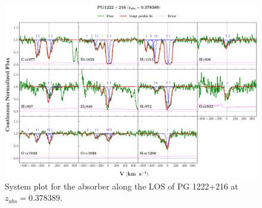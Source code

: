   
  \newpage
  \thispagestyle{empty}

  \begin{landscape}
  
  \begin{figure}
      \centering
      \vspace{-10mm}
      \hspace*{-20mm}
      \includegraphics[width=1.1\linewidth]{System-Plots/PG1222+216_z=0.378389_sys_plot.png}
      \caption{System plot for the absorber along the LOS of PG 1222+216 at $z_{abs} = 0.378389$. }
  \end{figure}
  
  \end{landscape}
  
